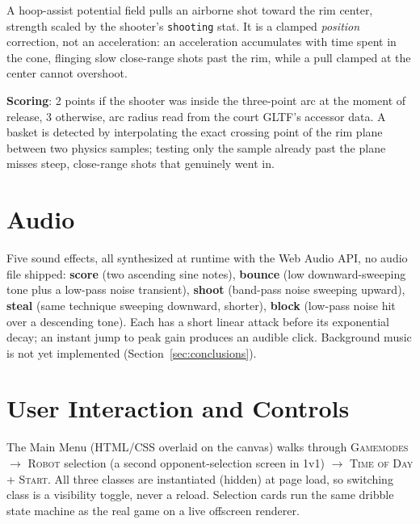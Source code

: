 \documentclass[11pt,a4paper]{article}
\begin{document}
A hoop-assist potential field pulls an airborne shot toward the rim center, strength scaled by the shooter's \verb|shooting| stat. It is a clamped \emph{position} correction, not an acceleration: an acceleration accumulates with time spent in the cone, flinging slow close-range shots past the rim, while a pull clamped at the center cannot overshoot.

\textbf{Scoring}: 2 points if the shooter was inside the three-point arc at the moment of release, 3 otherwise, arc radius read from the court GLTF's accessor data. A basket is detected by interpolating the exact crossing point of the rim plane between two physics samples; testing only the sample already past the plane misses steep, close-range shots that genuinely went in.

\section{Audio}
\label{sec:audio}

Five sound effects, all synthesized at runtime with the Web Audio API, no audio file shipped: \textbf{score} (two ascending sine notes), \textbf{bounce} (low downward-sweeping tone plus a low-pass noise transient), \textbf{shoot} (band-pass noise sweeping upward), \textbf{steal} (same technique sweeping downward, shorter), \textbf{block} (low-pass noise hit over a descending tone). Each has a short linear attack before its exponential decay; an instant jump to peak gain produces an audible click. Background music is not yet implemented (Section~\ref{sec:conclusions}).

\section{User Interaction and Controls}
\label{sec:interaction}

The Main Menu (HTML/CSS overlaid on the canvas) walks through \textsc{Gamemodes} $\rightarrow$ \textsc{Robot} selection (a second opponent-selection screen in 1v1) $\rightarrow$ \textsc{Time of Day} + \textsc{Start}. All three classes are instantiated (hidden) at page load, so switching class is a visibility toggle, never a reload. Selection cards run the same dribble state machine as the real game on a live offscreen renderer.
\end{document}
